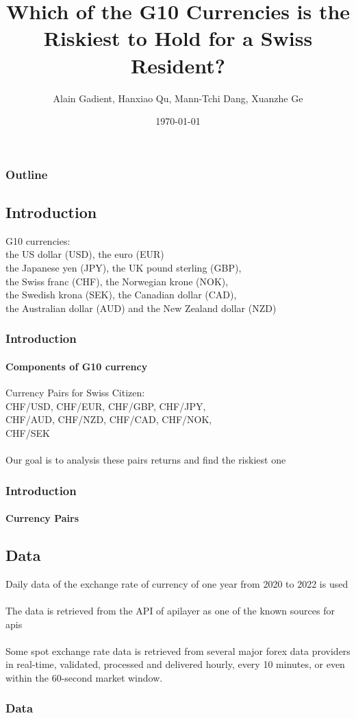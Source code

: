 \documentclass[10pt]{beamer}
\author{Alain Gadient, Hanxiao Qu, Mann-Tchi Dang, Xuanzhe Ge}
\title{Which of the G10 Currencies is the Riskiest to Hold for a Swiss Resident?}
\institute{University of Zurich}
\date{\today}
\begin{document}
\begin{frame}
    \titlepage
\end{frame}
\begin{frame}
    \frametitle{Outline}
    \tableofcontents
\end{frame}
\begin{frame}
\section{Introduction}
G10 currencies:\\ 
the US dollar (USD), the euro (EUR)\\ 
the Japanese yen (JPY), the UK pound sterling (GBP),
\\the Swiss franc (CHF), the Norwegian krone (NOK), 
\\the Swedish krona (SEK), the Canadian dollar (CAD), 
\\the Australian dollar (AUD) and the New Zealand dollar (NZD)
\frametitle{Introduction}
\framesubtitle{Components of G10 currency}

\end{frame}
\begin{frame}
Currency Pairs for Swiss Citizen: \\ 
CHF/USD, CHF/EUR, CHF/GBP, CHF/JPY,\\ 
CHF/AUD, CHF/NZD, CHF/CAD, CHF/NOK, \\
CHF/SEK
\\ \hspace*{\fill} \\
Our goal is to analysis these pairs returns and find the riskiest one
\frametitle{Introduction}
\framesubtitle{Currency Pairs}

\end{frame}
\begin{frame}
\section{Data}
Daily data of the exchange rate of currency of one year from 2020 to 2022 is used
\\ \hspace*{\fill} \\
The data is retrieved  from the API of apilayer as one of the known sources for apis
\\ \hspace*{\fill} \\
Some spot exchange rate data is retrieved from several major forex data providers in real-time, validated, processed and delivered hourly, every 10 minutes, or even within the 60-second market window.
\frametitle{Data}

\end{frame}
\end{document}
